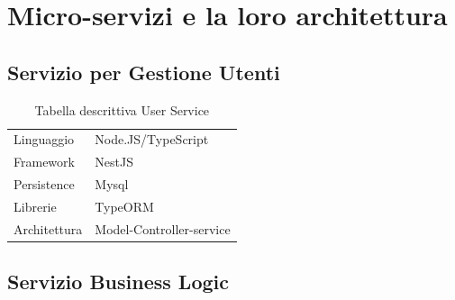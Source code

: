 \section{Micro-servizi e la loro architettura}




\subsection{Servizio per Gestione Utenti}

\begin{table}[h!]
    \centering
    \caption{Tabella descrittiva User Service}
    \label{tab:user_serv_table}
    \begin{tabular}{ll}     
        \toprule                   
        Linguaggio & Node.JS/TypeScript \\        
        Framework & NestJS   \\                   
        Persistence & Mysql  \\
        Librerie & TypeORM   \\
        Architettura & Model-Controller-service  \\
        \bottomrule
    \end{tabular}
\end{table}


\subsection{Servizio Business Logic}

